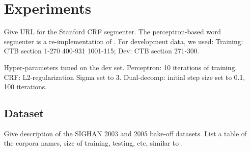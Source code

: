 \section{Experiments}

Give URL for the Stanford CRF segmenter. The perceptron-based word segmenter is a re-implementation of \cite{Zhang:2007:ACL}.
For development data, we used:
Training: CTB section 1-270  400-931 1001-115;   Dev: CTB section 271-300.

Hyper-parameters tuned on the dev set.
Perceptron: 10 iterations of training. 
CRF: L2-regularization Sigma set to 3.
Dual-decomp: initial step size set to 0.1, 100 iterations. 

\subsection{Dataset}
Give description of the SIGHAN 2003 \cite{Sproat:2003:SIGHAN} and 2005 \cite{Emerson:2005:SIGHAN} bake-off datasets. 
List a table of the corpora names, size of training, testing, etc, similar to \cite{Sun:2010:COLING}.
